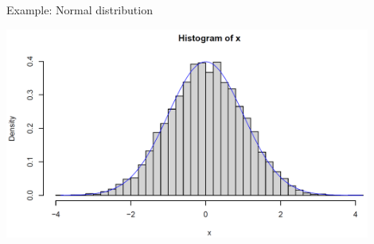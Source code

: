 \begin{vbframe}{Example: Normal distribution}
\begin{center}
\includegraphics[width =0.9\textwidth]{figure_man/histo.png}
\end{center}


\end{vbframe}




